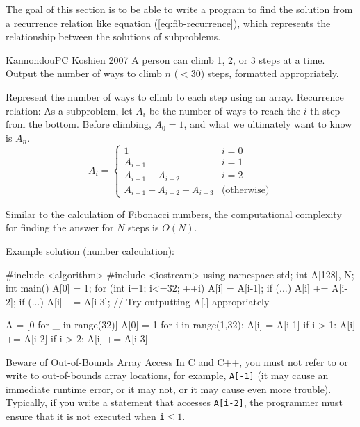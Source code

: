 The goal of this section is to be able to write a program to find the solution from a recurrence relation like equation (\ref{eq:fib-recurrence}), which represents the relationship between the solutions of subproblems.

\begin{psbox}{Kannondou}{PC Koshien 2007}
A person can climb 1, 2, or 3 steps at a time. Output the number of ways to climb $n$ ($<30$) steps, formatted appropriately.

\end{psbox}

Represent the number of ways to climb to each step using an array.
Recurrence relation: As a subproblem, let $A_i$ be the number of ways to reach the $i$-th step from the bottom. Before climbing, $A_0=1$, and what we ultimately want to know is $A_n$.\\
\begin{equation}
  A_i = \left\{
  \begin{array}{ll}
    1 & i=0\\
    A_{i-1} & i=1\\
    A_{i-1}+A_{i-2} & i=2\\
    A_{i-1}+A_{i-2}+A_{i-3} & \mbox{(otherwise)}
  \end{array}\right.
\end{equation}

Similar to the calculation of Fibonacci numbers, the computational complexity for finding the answer for $N$ steps is $O(N)$.

Example solution (number calculation):
\begin{cbox}
#include <algorithm>
#include <iostream>
using namespace std;
int A[128], N;
int main() {
    A[0] = 1;
    for (int i=1; i<=32; ++i) {
        A[i] = A[i-1];
        if (...) A[i] += A[i-2];
        if (...) A[i] += A[i-3];
    }
    // Try outputting A[.] appropriately
}
\end{cbox}

\begin{pybox}
A = [0 for _ in range(32)]
A[0] = 1
for i in range(1,32):
    A[i] = A[i-1]
    if i > 1:
        A[i] += A[i-2]
        if i > 2:
            A[i] += A[i-3]  
\end{pybox}

\begin{debugbox}{Beware of Out-of-Bounds Array Access}
  In C and C++, you must not refer to or write to out-of-bounds array locations, for example, \texttt{A[-1]} (it may cause an immediate runtime error, or it may not, or it may cause even more trouble). Typically, if you write a statement that accesses \texttt{A[i-2]}, the programmer must ensure that it is not executed when \texttt{i}$\le 1$.
\end{debugbox}

